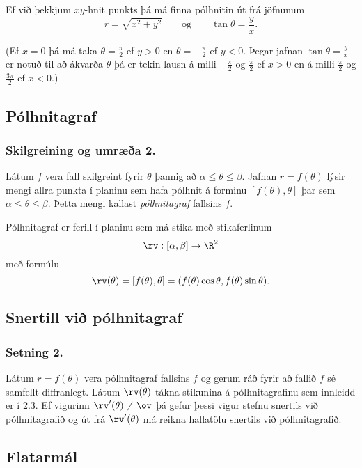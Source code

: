 Ef við þekkjum $xy$-hnit punkts þá má finna pólhnitin út frá jöfnunum
$$r=\sqrt{x^2+y^2}\qquad\mbox{og}
\qquad \tan\theta=\frac{y}{x}.$$

(Ef $x=0$ þá má taka $\theta=\frac{\pi}{2}$ ef $y>0$ en 
$\theta=-\frac{\pi}{2}$ ef $y<0$.  Þegar jafnan $\tan\theta=\frac{y}{x}$ er notuð til að ákvarða $\theta$ þá er tekin lausn á milli $-\frac{\pi}{2}$  og $\frac{\pi}{2}$ ef $x>0$ en á milli $\frac{\pi}{2}$ og $\frac{3\pi}{2}$ ef $x<0$.)



\subsection{Pólhnitagraf}
\subsubsection {Skilgreining og umræða 2. }Látum $f$ vera fall skilgreint fyrir 
$\theta$ þannig að 
$\alpha\leq\theta\leq\beta$.  Jafnan $r=f(\theta)$ lýsir mengi allra punkta í planinu sem hafa pólhnit á forminu $[f(\theta),\theta]$ þar sem $\alpha\leq\theta\leq\beta$.  Þetta mengi kallast {\em pólhnitagraf} fallsins $f$.

Pólhnitagraf er ferill í planinu sem má stika með stikaferlinum 
$$\rv:[\alpha,\beta]\rightarrow\R^2$$
með formúlu
$$\rv(\theta)=[f(\theta),\theta]=
(f(\theta)\cos\theta, f(\theta)\sin\theta).$$
 


\subsection{Snertill við pólhnitagraf}
 \subsubsection{Setning 2.}
  Látum $r=f(\theta)$ vera pólhnitagraf fallsins $f$ og gerum ráð fyrir að fallið $f$ sé samfellt diffranlegt.  Látum $\rv(\theta)$ tákna stikunina á pólhnitagrafinu sem innleidd er í 2.3.  Ef vigurinn 
$\rv'(\theta)\neq \ov$ þá gefur þessi vigur stefnu snertils við pólhnitagrafið og út frá $\rv'(\theta)$ má reikna hallatölu snertils við pólhnitagrafið.
 



\subsection{Flatarmál}
